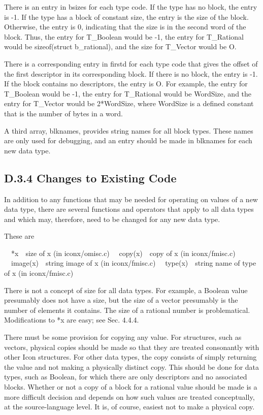 There is an entry in bsizes for each type code. If the type has no
block, the entry is -1. If the type has a block of constant size, the
entry is the size of the block. Otherwise, the entry is 0, indicating
that the size is in the second word of the block. Thus, the entry for
T\_Boolean would be -1, the entry for T\_Rational would be
sizeof(struct b\_rational), and the size for T\_Vector would be O.

There is a corresponding entry in firstd for each type code that gives
the offset of the first descriptor in its corresponding block. If
there is no block, the entry is -1. If the block contains no
descriptors, the entry is O. For example, the entry for T\_Boolean
would be -1, the entry for T\_Rational would be WordSize, and the
entry for T\_Vector would be 2*WordSize, where WordSize is a defined
constant that is the number of bytes in a word.

A third array, blknames, provides string names for all block
types. These names are only used for debugging, and an entry should be
made in blknames for each new data type.

\subsection{D.3.4 Changes to Existing Code}

In addition to any functions that may be needed for operating on
values of a new data type, there are several functions and operators
that apply to all data types and which may, therefore, need to be
changed for any new data type.

These are

\ \ *x\ \ size of x (in iconx/omisc.c)\newline
\ \ copy(x)\ \ copy of x (in iconx/fmisc.c)\newline
\ \ image(x)\ \ string image of x (in iconx/fmisc.c)\newline
\ \ type(x)\ \ string name of type of x (in iconx/fmisc.c)

There is not a concept of size for all data types. For example, a
Boolean value presumably does not have a size, but the size of a
vector presumably is the number of elements it contains. The size of a
rational number is problematical.  Modifications to *x are easy; see
Sec. 4.4.4.

There must be some provision for copying any value. For structures,
such as vectors, physical copies should be made so that they are
treated consonantly with other Icon structures. For other data types,
the {\textquotedbl}copy{\textquotedbl} consists of simply returning
the value and not making a physically distinct copy.  This should be
done for data types, such as Boolean, for which there are only
descriptors and no associated blocks.  Whether or not a copy of a
block for a rational value should be made is a more difficult decision
and depends on how such values are treated conceptually, at the
source-language level. It is, of course, easiest not to make a
physical copy.

